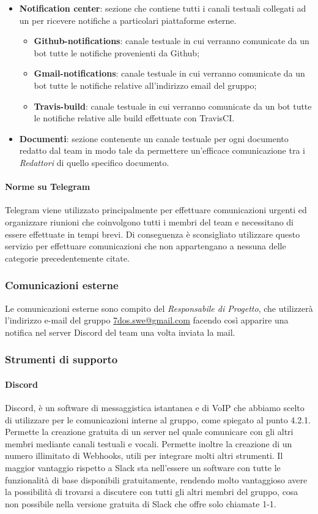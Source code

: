 \begin{itemize}
{	}
	\item{\textbf{Notification center}: sezione che contiene tutti i canali testuali collegati ad un  per ricevere notifiche a particolari piattaforme esterne.
		\begin{itemize}
			\item{\textbf{Github-notifications}: canale testuale in cui verranno comunicate da un bot tutte le notifiche provenienti da Github;}
			\item{\textbf{Gmail-notifications}: canale testuale in cui verranno comunicate da un bot tutte le notifiche relative all'indirizzo email del gruppo;}
			\item{\textbf{Travis-build}: canale testuale in cui verranno comunicate da un bot tutte le notifiche relative alle build effettuate con TravisCI.}			
		\end{itemize}
	}
	\item{\textbf{Documenti}: sezione contenente un canale testuale per ogni documento redatto dal team in modo tale da permettere un'efficace comunicazione tra i \emph{Redattori} di quello specifico documento.}
 \end{itemize}
\paragraph{Norme su Telegram}\Spazio
 Telegram viene utilizzato principalmente per effettuare comunicazioni urgenti ed organizzare riunioni che coinvolgono tutti i membri del team e necessitano di essere effettuate in tempi brevi. Di conseguenza è sconsigliato utilizzare questo servizio per effettuare comunicazioni che non appartengano a nessuna delle categorie precedentemente citate.

\subsubsection{Comunicazioni esterne}
Le comunicazioni esterne sono compito del \emph{Responsabile di Progetto}, che utilizzerà l'indirizzo e-mail del gruppo \href{mailto:7dos.swe@gmail.com}{7dos.swe@gmail.com} facendo così apparire una notifica nel server Discord del team una volta inviata la mail.
\subsubsection{Strumenti di supporto}
\paragraph{Discord}\Spazio
Discord, è un software di messaggistica istantanea e di VoIP che abbiamo scelto di utilizzare per le comunicazioni interne al gruppo, come spiegato al punto 4.2.1. Permette la creazione gratuita di un server nel quale comunicare con gli altri membri mediante canali testuali e vocali. Permette inoltre la creazione di un numero illimitato di Webhooks, utili per integrare molti altri strumenti.
Il maggior vantaggio rispetto a Slack sta nell'essere un software con tutte le funzionalità di base disponibili gratuitamente, rendendo molto vantaggioso avere la possibilità di trovarsi a discutere con tutti gli altri membri del gruppo, cosa non possibile nella versione gratuita di Slack che offre solo chiamate 1-1.
